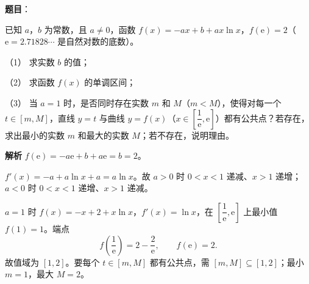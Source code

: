 \begin{answer}

\textbf{题目}：

已知 $a$，$b$ 为常数，且 $a\neq0$，函数 $f(x)=-ax+b+ax\ln x$，$f(\mathrm e)=2$（$\mathrm e=2.71828\cdots$ 是自然对数的底数）。

（1） 求实数 $b$ 的值；

（2） 求函数 $f(x)$ 的单调区间；

（3） 当 $a=1$ 时，是否同时存在实数 $m$ 和 $M$（$m<M$），使得对每一个 $t\in[m,M]$，直线 $y=t$ 与曲线 $y=f(x)$（$x\in\left[\dfrac1{\mathrm e},\mathrm e\right]$）都有公共点？若存在，求出最小的实数 $m$ 和最大的实数 $M$；若不存在，说明理由。

\textbf{解析}
$f(\mathrm e)=-a\mathrm e+b+a\mathrm e=b=2$。

$f'(x)=-a+a\ln x+a=a\ln x$。故 $a>0$ 时 $0<x<1$ 递减、$x>1$ 递增；$a<0$ 时 $0<x<1$ 递增、$x>1$ 递减。

$a=1$ 时 $f(x)=-x+2+x\ln x$，$f'(x)=\ln x$，在 $\left[\dfrac1{\mathrm e},\mathrm e\right]$ 上最小值 $f(1)=1$。端点
\nopagebreak[4]
\[f\left(\frac1{\mathrm e}\right)=2-\frac2{\mathrm e},\qquad f(\mathrm e)=2.\]
故值域为 $[1,2]$。要每个 $t\in[m,M]$ 都有公共点，需 $[m,M]\subseteq[1,2]$；最小 $m=1$，最大 $M=2$。




\end{answer}